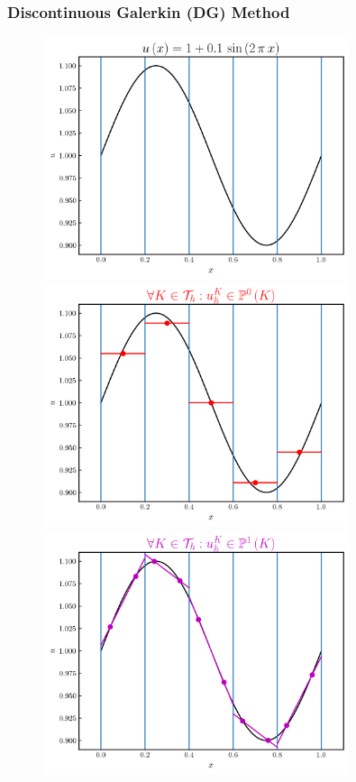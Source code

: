 \documentclass{beamer}
\begin{document}
\begin{frame}
\frametitle{Discontinuous Galerkin (DG) Method}

  \begin{figure}
    \begin{overprint}
        \centering\includegraphics[width=0.8\textwidth]{./fig.sine.png}
        \centering\includegraphics[width=0.8\textwidth]{./fig.sine_k0.png}
        \centering\includegraphics[width=0.8\textwidth]{./fig.sine_k1.png}

\end{overprint}
\end{figure}
\end{frame}
\end{document}
